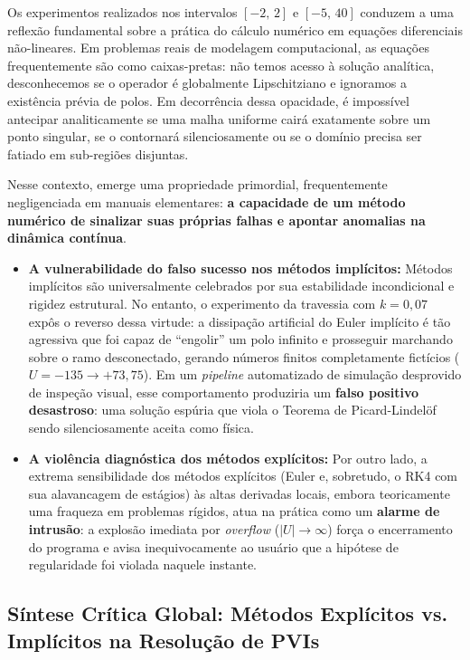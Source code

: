 \documentclass[12pt, a4paper]{article}
\begin{document}
Os experimentos realizados nos intervalos $[-2,\, 2]$ e $[-5,\, 40]$ conduzem a uma reflexão fundamental sobre a prática do cálculo numérico em equações diferenciais não-lineares. Em problemas reais de modelagem computacional, as equações frequentemente são como caixas-pretas: não temos acesso à solução analítica, desconhecemos se o operador é globalmente Lipschitziano e ignoramos a existência prévia de polos. Em decorrência dessa opacidade, é impossível antecipar analiticamente se uma malha uniforme cairá exatamente sobre um ponto singular, se o contornará silenciosamente ou se o domínio precisa ser fatiado em sub-regiões disjuntas.

Nesse contexto, emerge uma propriedade primordial, frequentemente negligenciada em manuais elementares: \textbf{a capacidade de um método numérico de sinalizar suas próprias falhas e apontar anomalias na dinâmica contínua}.

\begin{itemize}
    \item \textbf{A vulnerabilidade do falso sucesso nos métodos implícitos:} Métodos implícitos são universalmente celebrados por sua estabilidade incondicional e rigidez estrutural. No entanto, o experimento da travessia com $k = 0{,}07$ expôs o reverso dessa virtude: a dissipação artificial do Euler implícito é tão agressiva que foi capaz de ``engolir'' um polo infinito e prosseguir marchando sobre o ramo desconectado, gerando números finitos completamente fictícios ($U = -135 \to +73{,}75$). Em um \emph{pipeline} automatizado de simulação desprovido de inspeção visual, esse comportamento produziria um \textbf{falso positivo desastroso}: uma solução espúria que viola o Teorema de Picard-Lindelöf sendo silenciosamente aceita como física.
    \item \textbf{A violência diagnóstica dos métodos explícitos:} Por outro lado, a extrema sensibilidade dos métodos explícitos (Euler e, sobretudo, o RK4 com sua alavancagem de estágios) às altas derivadas locais, embora teoricamente uma fraqueza em problemas rígidos, atua na prática como um \textbf{alarme de intrusão}: a explosão imediata por \emph{overflow} ($|U| \to \infty$) força o encerramento do programa e avisa inequivocamente ao usuário que a hipótese de regularidade foi violada naquele instante.
\end{itemize}
\subsection{Síntese Crítica Global: Métodos Explícitos vs. Implícitos na Resolução de PVIs}
\label{sec:d-sintese-final}
\end{document}
